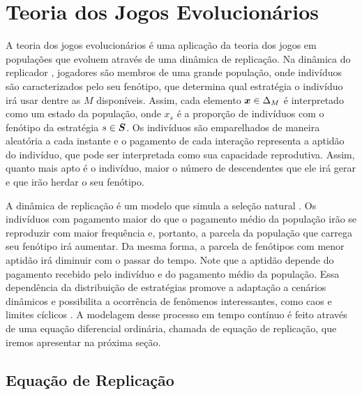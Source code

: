 \chapter{Teoria dos Jogos Evolucionários}

A teoria dos jogos evolucionários é uma aplicação da teoria dos jogos em populações que evoluem através de uma dinâmica de replicação. Na dinâmica do replicador \cite{madeo2015,hofbauer_sigmund_1998}, jogadores são membros de uma grande população, onde indivíduos são caracterizados pelo seu fenótipo, que determina qual estratégia o indivíduo irá usar dentre as $M$ disponíveis. Assim, cada elemento $\boldsymbol{x}\in\Delta_M$ é interpretado como um estado da população, onde $x_s$ é a proporção de indivíduos com o fenótipo da estratégia $s\in\boldsymbol{S}$. Os indivíduos são emparelhados de maneira aleatória a cada instante e o pagamento de cada interação representa a aptidão do indivíduo, que pode ser interpretada como sua capacidade reprodutiva. Assim, quanto mais apto é o indivíduo, maior o número de descendentes que ele irá gerar e que irão herdar o seu fenótipo.

A dinâmica de replicação é um modelo que simula a seleção natural \cite{madeo2015}. Os indivíduos com pagamento maior do que o pagamento médio da população irão se reproduzir com maior frequência e, portanto, a parcela da população que carrega seu fenótipo irá aumentar. Da mesma forma, a parcela de fenótipos com menor aptidão irá diminuir com o passar do tempo. Note que a aptidão depende do pagamento recebido pelo indivíduo e do pagamento médio da população. Essa dependência da distribuição de estratégias promove a adaptação a cenários dinâmicos e possibilita a ocorrência de fenômenos interessantes, como caos e limites cíclicos \cite{hofbauer_sigmund_1998}. A modelagem desse processo em tempo contínuo é feito através de uma equação diferencial ordinária, chamada de equação de replicação, que iremos apresentar na próxima seção.


\section{Equação de Replicação}

